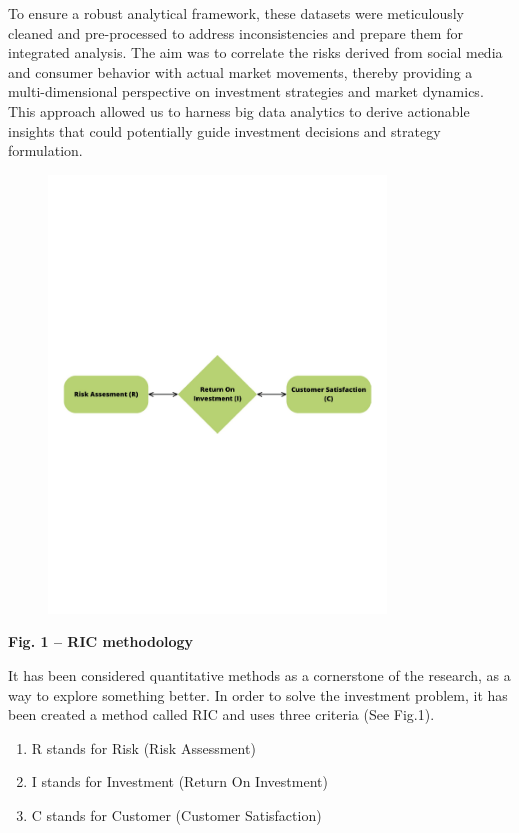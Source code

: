 {To ensure a robust analytical framework, these datasets were
meticulously cleaned and pre-processed to address inconsistencies and
prepare them for integrated analysis. The aim was to correlate the risks
derived from social media and consumer behavior with actual market
movements, thereby providing a multi-dimensional perspective on
investment strategies and market dynamics. This approach allowed us to
harness big data analytics to derive actionable insights that could
potentially guide investment decisions and strategy formulation.

\begin{figure}[H]
	\centering
	\includegraphics[width=0.8\textwidth]{media/ict2/image9}
	\caption*{}
\end{figure}


{\bfseries Fig. 1 -- RIC methodology}

It has been considered quantitative methods as a cornerstone of the
research, as a way to explore something better. In order to solve the
investment problem, it has been created a method called RIC and uses
three criteria (See Fig.1).

\begin{enumerate}
\def\labelenumi{\arabic{enumi})}
\item
  R stands for Risk (Risk Assessment)
\item
  I stands for Investment (Return On Investment)
\item
  C stands for Customer (Customer Satisfaction)
\end{enumerate}

}
